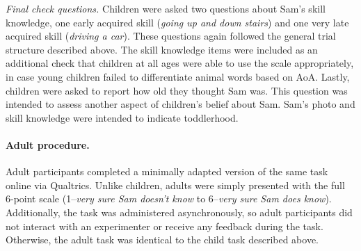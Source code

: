 \documentclass[10pt, letterpaper]{article}
\begin{document}
\emph{Final check questions.} Children were asked two questions about
Sam's skill knowledge, one early acquired skill (\emph{going up and down
stairs}) and one very late acquired skill (\emph{driving a car}). These
questions again followed the general trial structure described above.
The skill knowledge items were included as an additional check that
children at all ages were able to use the scale appropriately, in case
young children failed to differentiate animal words based on AoA.
Lastly, children were asked to report how old they thought Sam was. This
question was intended to assess another aspect of children's belief
about Sam. Sam's photo and skill knowledge were intended to indicate
toddlerhood.

\hypertarget{adult-procedure.}{%
\paragraph{Adult procedure.}\label{adult-procedure.}}

Adult participants completed a minimally adapted version of the same
task online via Qualtrics. Unlike children, adults were simply presented
with the full 6-point scale (1--\emph{very sure Sam doesn't know} to
6--\emph{very sure Sam does know}). Additionally, the task was
administered asynchronously, so adult participants did not interact with
an experimenter or receive any feedback during the task. Otherwise, the
adult task was identical to the child task described above.
\end{document}
